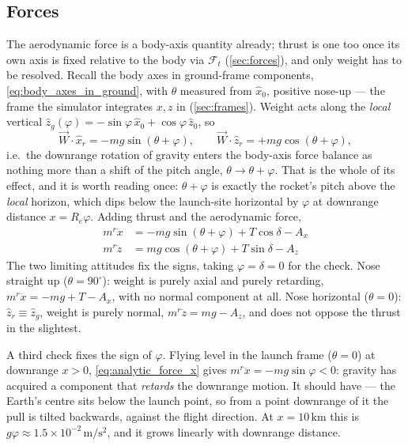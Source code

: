 \subsection{Forces}\label{sec:analysis_forces}
The aerodynamic force is a body-axis quantity already; thrust is one too once its own axis is
fixed relative to the body via $\mathcal{F}_t$ (\autoref{sec:forces}), and only weight has to be
resolved. Recall the body axes in ground-frame components, \autoref{eq:body_axes_in_ground}, with
$\theta$ measured from $\hat{x}_0$, positive nose-up --- the frame the simulator integrates $x,z$
in (\autoref{sec:frames}). Weight acts along the
\emph{local} vertical $\hat{z}_g(\varphi)=-\sin\varphi\,\hat{x}_0+\cos\varphi\,\hat{z}_0$, so
\begin{equation}
    \vec{W}\cdot\hat{x}_r = -mg\sin(\theta+\varphi), \qquad
    \vec{W}\cdot\hat{z}_r = +mg\cos(\theta+\varphi),
\end{equation}
i.e.\ the downrange rotation of gravity enters the body-axis force balance as nothing more than a
shift of the pitch angle, $\theta\to\theta+\varphi$. That is the whole of its effect, and it is
worth reading once: $\theta+\varphi$ is exactly the rocket's pitch above the \emph{local} horizon,
which dips below the launch-site horizontal by $\varphi$ at downrange distance $x=R_e\varphi$.
Adding thrust and the aerodynamic force,
\begin{align}
    m{}^r\ddot{x} &= -mg\sin(\theta+\varphi) + T\cos\delta - A_x \label{eq:analytic_force_x}\\
    m{}^r\ddot{z} &= mg\cos(\theta+\varphi) + T\sin\delta - A_z \label{eq:analytic_force_z}
\end{align}
The two limiting attitudes fix the signs, taking $\varphi=\delta=0$ for the check. Nose straight
up ($\theta=90^\circ$): weight is purely axial and purely retarding, $m{}^r\ddot{x}=-mg+T-A_x$,
with no normal component at all. Nose horizontal ($\theta=0$): $\hat{z}_r\equiv\hat{z}_g$, weight
is purely normal, $m{}^r\ddot{z}=mg-A_z$, and does not oppose the thrust in the slightest.

A third check fixes the sign of $\varphi$. Flying level in the launch frame ($\theta=0$) at
downrange $x>0$, \autoref{eq:analytic_force_x} gives $m{}^r\ddot{x}=-mg\sin\varphi<0$: gravity has
acquired a component that \emph{retards} the downrange motion. It should have --- the Earth's
centre sits below the launch point, so from a point downrange of it the pull is tilted backwards,
against the flight direction. At $x=10\,\mathrm{km}$ this is $g\varphi\approx
1.5\times10^{-2}\,\mathrm{m/s^2}$, and it grows linearly with downrange distance.

